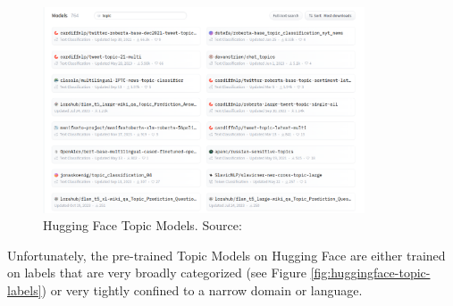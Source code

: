 \begin{figure}[H]   %
    \centering
    \includegraphics[width=0.85\textwidth]{Assets/huggingface-topic-models}
    \caption{Hugging Face Topic Models. Source: \cite{huggingface}}
    \label{fig:huggingface-topic-models}
\end{figure}

Unfortunately, the pre-trained Topic Models on Hugging Face \cite{huggingface} are either trained on labels that are very broadly categorized (see Figure \ref{fig:huggingface-topic-labels}) or very tightly confined to a narrow domain or language.

